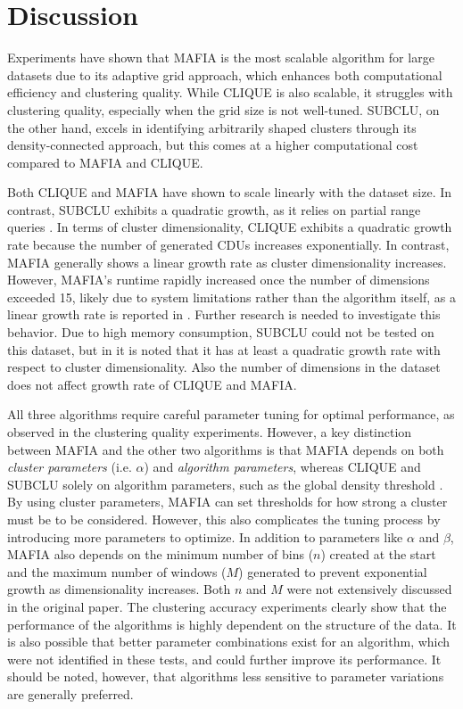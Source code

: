 \section{Discussion}
Experiments have shown that MAFIA is the most scalable algorithm for large datasets due to its adaptive grid approach, which enhances both computational efficiency and clustering quality. While CLIQUE is also scalable, it struggles with clustering quality, especially when the grid size is not well-tuned. SUBCLU, on the other hand, excels in identifying arbitrarily shaped clusters through its density-connected approach, but this comes at a higher computational cost compared to MAFIA and CLIQUE.

Both CLIQUE and MAFIA have shown to scale linearly with the dataset size. In contrast, SUBCLU exhibits a quadratic growth, as it relies on partial range queries \cite{subclu}. In terms of cluster dimensionality, CLIQUE exhibits a quadratic growth rate because the number of generated CDUs increases exponentially. In contrast, MAFIA generally shows a linear growth rate as cluster dimensionality increases. However, MAFIA's runtime rapidly increased once the number of dimensions exceeded 15, likely due to system limitations rather than the algorithm itself, as a linear growth rate is reported in \cite{mafia}. Further research is needed to investigate this behavior. Due to high memory consumption, SUBCLU could not be tested on this dataset, but in \cite{subclu} it is noted that it has at least a quadratic growth rate with respect to cluster dimensionality. Also the number of dimensions in the dataset does not affect growth rate of CLIQUE and MAFIA.

All three algorithms require careful parameter tuning for optimal performance, as observed in the clustering quality experiments. However, a key distinction between MAFIA and the other two algorithms is that MAFIA depends on both \textit{cluster parameters} (i.e. $\alpha$) and \textit{algorithm parameters}, whereas CLIQUE and SUBCLU solely on algorithm parameters, such as the global density threshold \cite[p.~342]{sim-2012}. By using cluster parameters, MAFIA can set thresholds for how strong a cluster must be to be considered. However, this also complicates the tuning process by introducing more parameters to optimize. In addition to parameters like $\alpha$ and $\beta$, MAFIA also depends on the minimum number of bins ($n$) created at the start and the maximum number of windows ($M$) generated to prevent exponential growth as dimensionality increases. Both $n$ and $M$ were not extensively discussed in the original paper. The clustering accuracy experiments clearly show that the performance of the algorithms is highly dependent on the structure of the data. It is also possible that better parameter combinations exist for an algorithm, which were not identified in these tests, and could further improve its performance. It should be noted, however, that algorithms less sensitive to parameter variations are generally preferred.


